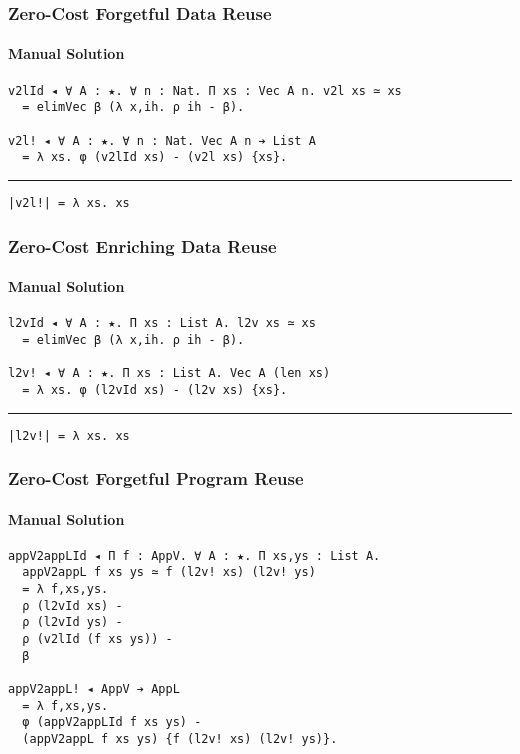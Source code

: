\documentclass[mathserif,usenames,dvipsnames]{beamer}
\begin{document}
\begin{frame}[fragile]
\frametitle{Zero-Cost Forgetful Data Reuse}
\framesubtitle{Manual Solution}

\begin{verbatim}
v2lId ◂ ∀ A : ★. ∀ n : Nat. Π xs : Vec A n. v2l xs ≃ xs 
  = elimVec β (λ x,ih. ρ ih - β).

v2l! ◂ ∀ A : ★. ∀ n : Nat. Vec A n ➔ List A
  = λ xs. φ (v2lId xs) - (v2l xs) {xs}.
\end{verbatim}

\noindent\rule{\textwidth}{1pt}

\begin{verbatim}
|v2l!| = λ xs. xs
\end{verbatim}

\end{frame}

\begin{frame}[fragile]
\frametitle{Zero-Cost Enriching Data Reuse}
\framesubtitle{Manual Solution}

\begin{verbatim}
l2vId ◂ ∀ A : ★. Π xs : List A. l2v xs ≃ xs 
  = elimVec β (λ x,ih. ρ ih - β).

l2v! ◂ ∀ A : ★. Π xs : List A. Vec A (len xs)
  = λ xs. φ (l2vId xs) - (l2v xs) {xs}.
\end{verbatim}

\noindent\rule{\textwidth}{1pt}

\begin{verbatim}
|l2v!| = λ xs. xs
\end{verbatim}

\end{frame}

\begin{frame}[fragile]
\frametitle{Zero-Cost Forgetful Program Reuse}
\framesubtitle{Manual Solution}

\begin{verbatim}
appV2appLId ◂ Π f : AppV. ∀ A : ★. Π xs,ys : List A. 
  appV2appL f xs ys ≃ f (l2v! xs) (l2v! ys)
  = λ f,xs,ys.        
  ρ (l2vId xs) -      
  ρ (l2vId ys) -      
  ρ (v2lId (f xs ys)) -
  β

appV2appL! ◂ AppV ➔ AppL
  = λ f,xs,ys.
  φ (appV2appLId f xs ys) - 
  (appV2appL f xs ys) {f (l2v! xs) (l2v! ys)}.
\end{verbatim}

\end{frame}
\end{document}
